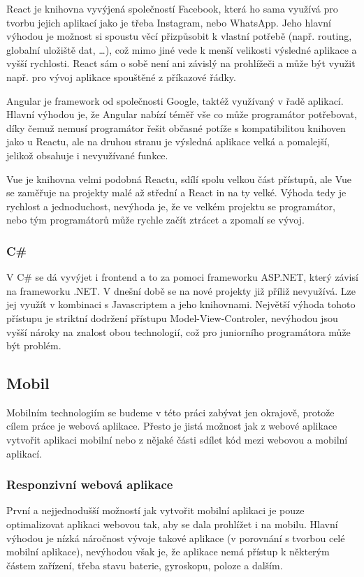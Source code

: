 React je knihovna vyvýjená společností Facebook, která ho sama využívá pro tvorbu jejich aplikací jako je třeba Instagram, nebo WhatsApp. Jeho hlavní výhodou je možnost si spoustu věcí přizpůsobit k vlastní potřebě (např. routing, globalní uložiště dat, \ldots{}), což mimo jiné vede k menší velikosti výsledné aplikace a vyšší rychlosti. React sám o sobě není ani závislý na prohlížeči a může být využit např. pro vývoj aplikace spouštěné z příkazové řádky.

Angular je framework od společnosti Google, taktéž využívaný v řadě aplikací. Hlavní výhodou je, že Angular nabízí téměř vše co může programátor potřebovat, díky čemuž nemusí programátor řešit občasné potíže s kompatibilitou knihoven jako u Reactu, ale na druhou stranu je výsledná aplikace velká a pomalejší, jelikož obsahuje i nevyužívané funkce.

Vue je knihovna velmi podobná Reactu, sdílí spolu velkou část přístupů, ale Vue se zaměřuje na projekty malé až střední a React in na ty velké. Výhoda tedy je rychlost a jednoduchost, nevýhoda je, že ve velkém projektu se programátor, nebo tým programátorů může rychle začít ztrácet a zpomalí se vývoj.

\subsubsection*{C\# }
V C\# se dá vyvýjet i frontend a to za pomoci frameworku ASP.NET, který závisí na frameworku .NET. V dnešní době se na nové projekty již příliž nevyužívá. Lze jej využít v kombinaci s Javascriptem a jeho knihovnami. Největší výhoda tohoto přístupu je striktní dodržení přístupu Model-View-Controler, nevýhodou jsou vyšší nároky na znalost obou technologií, což pro juniorního programátora může být problém.

\subsection{Mobil}
\label{ss:mobile}
Mobilním technologiím se budeme v této práci zabývat jen okrajově, protože cílem práce je webová aplikace. Přesto je jistá možnost jak z webové aplikace vytvořit aplikaci mobilní nebo z nějaké části sdílet kód mezi webovou a mobilní aplikací.

\subsubsection*{Responzivní webová aplikace}
\label{sss:responsive_web_app}
První a nejjednodušší možností jak vytvořit mobilní aplikaci je pouze optimalizovat aplikaci webovou tak, aby se dala prohlížet i na mobilu. Hlavní výhodou je nízká náročnost vývoje takové aplikace (v porovnání s tvorbou celé mobilní aplikace), nevýhodou však je, že aplikace nemá přístup k některým částem zařízení, třeba stavu baterie, gyroskopu, poloze a dalším.

